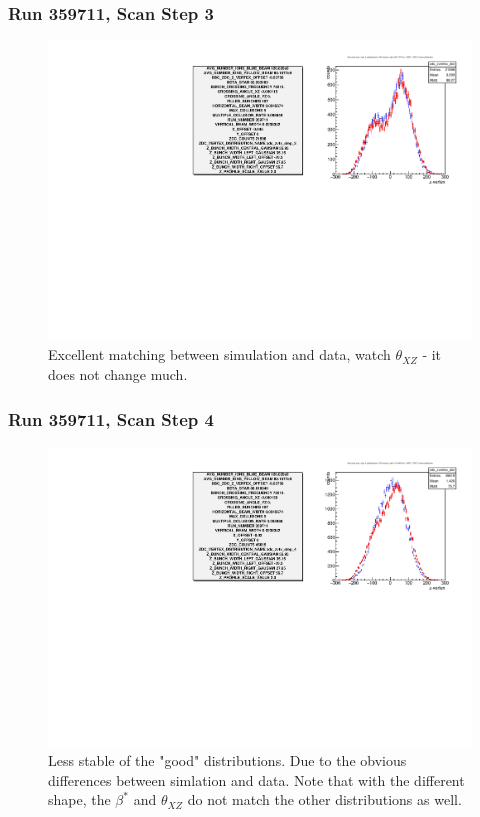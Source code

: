 \begin{frame}
\frametitle{Run 359711, Scan Step 3}
\begin{figure}
\begin{center}
\includegraphics[width=\linewidth]{"figures/359711_step_3_zdc_zvertex"}
\caption{Excellent matching between simulation and data, watch $\theta_{XZ}$ - it does not change much.}
\label{fig:359711_step_3_zdc_zvertex}
\end{center}\end{figure}
\end{frame}

\begin{frame}
\frametitle{Run 359711, Scan Step 4}
\begin{figure}
\begin{center}
\includegraphics[width=\linewidth]{"figures/359711_step_4_zdc_zvertex"}
\caption{Less stable of the "good" distributions. Due to the obvious differences between simlation and data. Note that with the different shape, the $\beta^*$ and $\theta_{XZ}$ do not match the other distributions as well.}
\label{fig:359711_step_4_zdc_zvertex}
\end{center}\end{figure}
\end{frame}

